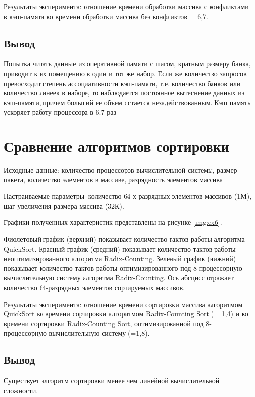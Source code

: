 Результаты эксперимента: отношение времени обработки массива с конфликтами в кэш-памяти ко времени обработки массива без конфликтов = 6,7.

\section*{Вывод}
Попытка читать данные из оперативной памяти с шагом, кратным размеру банка, приводит к их помещению в один и тот же набор. Если же количество запросов превосходит степень ассоциативности кэш-памяти, т.е. количество банков или количество линеек в наборе, то наблюдается постоянное вытеснение данных из кэш-памяти, причем больший ее объем остается незадействованным. Кэш память ускоряет работу процессора в 6.7 раз


\chapter*{Сравнение алгоритмов сортировки}

Исходные данные: количество процессоров вычислительной системы, размер пакета, количество элементов в массиве, разрядность элементов массива

Настраиваемые параметры: количество 64-х разрядных элементов массивов (1М), шаг увеличения размера массива (32К).

Графики полученных характеристик представлены на рисунке \ref{img:ex6}.



Фиолетовый график (верхний) показывает количество тактов работы
алгоритма QuickSort. Красный график (средний) показывает  количество тактов работы неоптимизированного алгоритма Radix-Counting. Зеленый график (нижний)
показывает количество тактов работы оптимизированного под 8-процессорную вычислительную систему алгоритма Radix-Counting. Ось абсцисс отражает количество 64-разрядных элементов сортируемых массивов.

Результаты эксперимента: отношение времени сортировки массива алгоритмом QuickSort ко времени сортировки алгоритмом Radix-Counting Sort (= 1,4) и ко времени сортировки Radix-Counting Sort, оптимизированной под 8-процессорную вычислительную систему (=1,8).


\section*{Вывод}
 Существует алгоритм сортировки менее чем линейной вычислительной сложности.

 
